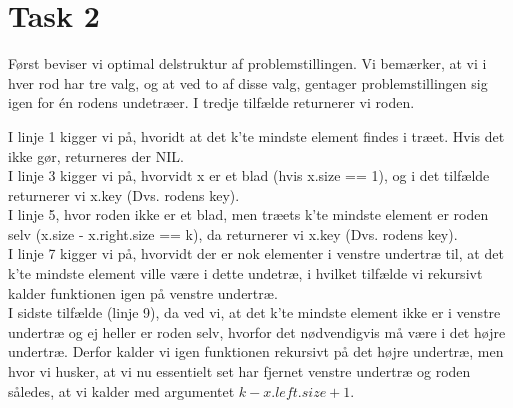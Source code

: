 \section{Task 2}

Først beviser vi optimal delstruktur af problemstillingen.
Vi bemærker, at vi i hver rod har tre valg, og at ved to af disse valg, gentager problemstillingen sig igen for én rodens undetræer.
I tredje tilfælde returnerer vi roden.

I linje 1 kigger vi på, hvoridt at det k'te mindste element findes i træet. Hvis det ikke gør, returneres der NIL.\\
I linje 3 kigger vi på, hvorvidt x er et blad (hvis x.size == 1), og i det tilfælde returnerer vi x.key (Dvs. rodens key).\\
I linje 5, hvor roden ikke er et blad, men træets k'te mindste element er roden selv (x.size - x.right.size == k), da returnerer vi x.key (Dvs. rodens key).\\ 
I linje 7 kigger vi på, hvorvidt der er nok elementer i venstre undertræ til, at det k'te mindste element ville være i dette undetræ, i hvilket tilfælde vi rekursivt kalder funktionen igen på venstre undertræ.\\
I sidste tilfælde (linje 9), da ved vi, at det k'te mindste element ikke er i venstre undertræ og ej heller er roden selv, hvorfor det nødvendigvis må være i det højre undertræ. Derfor kalder vi igen funktionen rekursivt på det højre undertræ, men hvor vi husker, at vi nu essentielt set har fjernet venstre undertræ og roden således, at vi kalder med argumentet $k-x.left.size + 1$.

